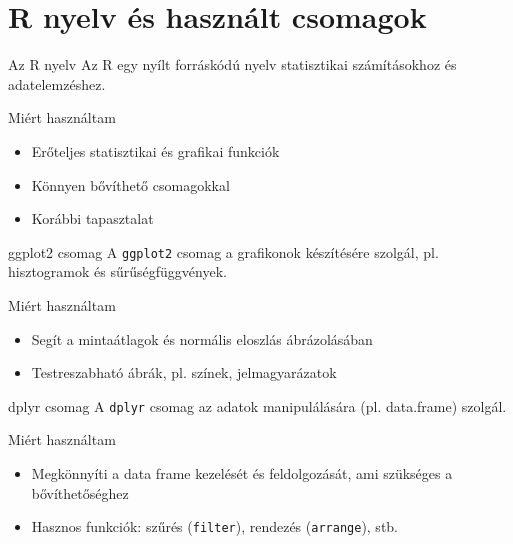 \documentclass[aspectratio=169,12pt]{beamer}
\begin{document}
	\section{R nyelv és használt csomagok}
	\begin{frame}{Az R nyelv}
		Az R egy nyílt forráskódú nyelv statisztikai számításokhoz és adatelemzéshez.
		\vfill
		\begin{block}{Miért használtam}
			\begin{itemize}
				\item Erőteljes statisztikai és grafikai funkciók
				\item Könnyen bővíthető csomagokkal
				\item Korábbi tapasztalat
			\end{itemize}
		\end{block}
	\end{frame}
	
	\begin{frame}{ggplot2 csomag}
		A \texttt{ggplot2} csomag a grafikonok készítésére szolgál, pl. hisztogramok és sűrűségfüggvények.
		\vfill
		\begin{block}{Miért használtam}
			\begin{itemize}
				\item Segít a mintaátlagok és normális eloszlás ábrázolásában
				\item Testreszabható ábrák, pl. színek, jelmagyarázatok
			\end{itemize}
		\end{block}
	\end{frame}
	
	\begin{frame}{dplyr csomag}
		A \texttt{dplyr} csomag az adatok manipulálására (pl. data.frame) szolgál.
		\vfill
		\begin{block}{Miért használtam}
			\begin{itemize}
				\item Megkönnyíti a data frame kezelését és feldolgozását, ami szükséges a bővíthetőséghez
				\item Hasznos funkciók: szűrés (\texttt{filter}), rendezés (\texttt{arrange}), stb.
			\end{itemize}
		\end{block}
	\end{frame}
	
\end{document}
